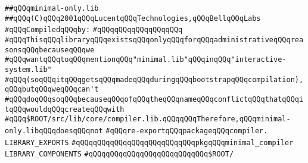 \label{src/lib/core/compiler/minimal-only.lib}
\verb|##qQQqminimal-only.lib|\newline
\verb|##qQQq(C)qQQq2001qQQqLucentqQQqTechnologies,qQQqBellqQQqLabs|\newline
\newline
\verb|#qQQqCompiledqQQqby:|\newline
\verb|#qQQqqQQqqQQqqQQqqQQq|\newline
\newline
\newline
\newline
\verb|#qQQqThisqQQqlibraryqQQqexistsqQQqonlyqQQqforqQQqadministrativeqQQqreasonsqQQqbecauseqQQqwe|\newline
\verb|#qQQqwantqQQqtoqQQqmentionqQQq"minimal.lib"qQQqinqQQq"interactive-system.lib"|\newline
\verb|#qQQq(soqQQqitqQQqgetsqQQqmadeqQQqduringqQQqbootstrapqQQqcompilation),qQQqbutqQQqweqQQqcan't|\newline
\verb|#qQQqdoqQQqsoqQQqbecauseqQQqofqQQqtheqQQqnameqQQqconflictqQQqthatqQQqitqQQqwouldqQQqcreateqQQqwith|\newline
\verb|#qQQq$ROOT/src/lib/core/compiler.lib.qQQqqQQqTherefore,qQQqminimal-only.libqQQqdoesqQQqnot|\newline
\verb|#qQQqre-exportqQQqpackageqQQqcompiler.|\newline
\newline
\newline
\verb|LIBRARY_EXPORTS|\newline
\newline
\verb|#qQQqqQQqqQQqqQQqqQQqqQQqqQQqpkgqQQqminimal_compiler|\newline
\newline
\newline
\newline
\verb|LIBRARY_COMPONENTS|\newline
\newline
\verb|#qQQqqQQqqQQqqQQqqQQqqQQqqQQq$ROOT/|\newline

